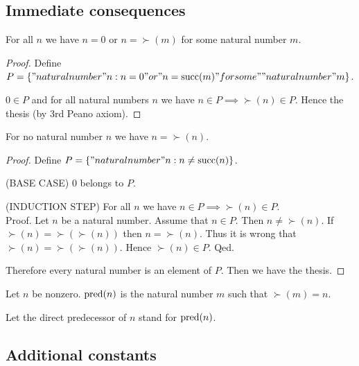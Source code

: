 \documentclass[../../natural-numbers.ftl.tex]{subfiles}
\begin{document}
  \subsection{Immediate consequences}

  \begin{forthel}
    \begin{proposition}[NN 01 01 178800]
      For all $n$ we have $n = 0$ or $n = \succ(m)$ for some natural number $m$.
    \end{proposition}
    \begin{proof}
      Define $P = \{ "natural number" n : n = 0 "or" n = \succ(m) "for some"\\"natural number" m \}$.

      $0 \in P$ and for all natural numbers $n$ we have $n \in P \implies \succ(n) \in P$.
      Hence the thesis (by 3rd Peano axiom).
    \end{proof}

    \begin{proposition}[NN 01 01 670417]
      For no natural number $n$ we have $n = \succ(n)$.
    \end{proposition}
    \begin{proof}
      Define $P = \{ "natural number" n : n \neq \succ(n) \}$.

      (BASE CASE) $0$ belongs to $P$.

      (INDUCTION STEP) For all $n$ we have $n \in P \implies \succ(n) \in P$. \\
      Proof.
        Let $n$ be a natural number.
        Assume that $n \in P$.
        Then $n \neq \succ(n)$.
        If $\succ(n) = \succ(\succ(n))$ then $n = \succ(n)$.
        Thus it is wrong that $\succ(n) = \succ(\succ(n))$.
        Hence $\succ(n) \in P$.
      Qed.

      Therefore every natural number is an element of $P$.
      Then we have the thesis.
    \end{proof}

    \begin{definition}
      Let $n$ be nonzero.
      $\pred(n)$ is the natural number $m$ such that $\succ(m) = n$.
    \end{definition}

    Let the direct predecessor of $n$ stand for $\pred(n)$.
  \end{forthel}


  \subsection{Additional constants}
\end{document}
